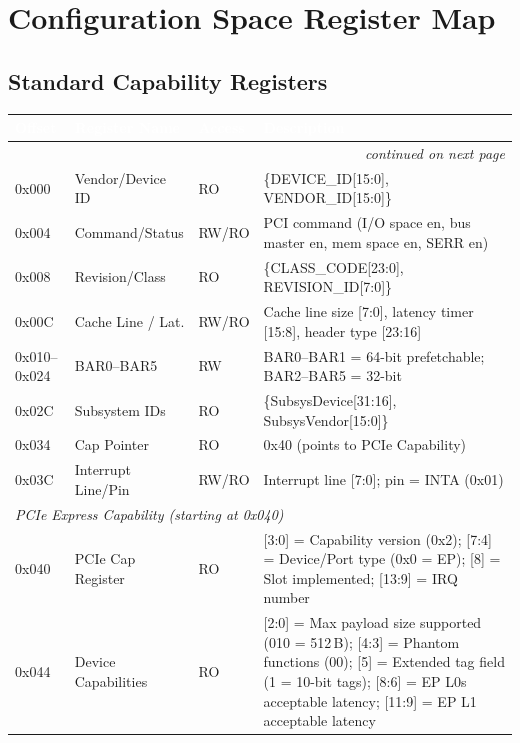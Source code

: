 \documentclass[11pt,a4paper]{article}
\newcommand{\theadcell}[1]{%
  \cellcolor{tablehead}\textcolor{white}{\textbf{#1}}}
\begin{document}
\section{Configuration Space Register Map}

\subsection{Standard Capability Registers}

\begin{longtable}{p{2.5cm}p{4.5cm}p{1.5cm}p{5.5cm}}
  \toprule
  \theadcell{Offset} & \theadcell{Register Name} & \theadcell{Access} & \theadcell{Description} \\
  \midrule
  \endhead
  \multicolumn{4}{r}{\small\itshape continued on next page} \\
  \endfoot
  \endlastfoot
  0x000        & Vendor/Device ID   & RO    & \{DEVICE\_ID[15:0], VENDOR\_ID[15:0]\} \\
  0x004        & Command/Status     & RW/RO & PCI command (I/O space en, bus master en, mem space en, SERR en) \\
  0x008        & Revision/Class     & RO    & \{CLASS\_CODE[23:0], REVISION\_ID[7:0]\} \\
  0x00C        & Cache Line / Lat.  & RW/RO & Cache line size [7:0], latency timer [15:8], header type [23:16] \\
  0x010--0x024 & BAR0--BAR5         & RW    & BAR0--BAR1 = 64-bit prefetchable; BAR2--BAR5 = 32-bit \\
  0x02C        & Subsystem IDs      & RO    & \{SubsysDevice[31:16], SubsysVendor[15:0]\} \\
  0x034        & Cap Pointer        & RO    & 0x40 (points to PCIe Capability) \\
  0x03C        & Interrupt Line/Pin & RW/RO & Interrupt line [7:0]; pin = INTA (0x01) \\
  \midrule
  \multicolumn{4}{l}{\textit{PCIe Express Capability (starting at 0x040)}} \\
  \midrule
  0x040        & PCIe Cap Register  & RO    & [3:0] = Capability version (0x2); [7:4] = Device/Port type (0x0 = EP); [8] = Slot implemented; [13:9] = IRQ number \\
  0x044        & Device Capabilities & RO   & [2:0] = Max payload size supported (010 = 512\,B); [4:3] = Phantom functions (00); [5] = Extended tag field (1 = 10-bit tags); [8:6] = EP L0s acceptable latency; [11:9] = EP L1 acceptable latency \\

\end{longtable}
\end{document}
